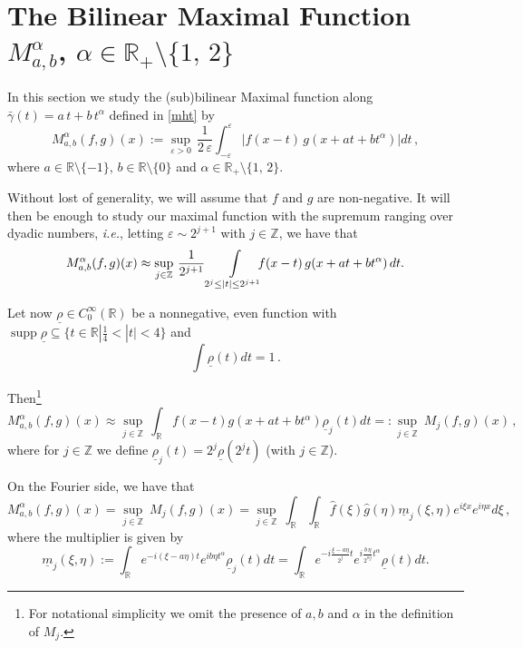 \documentclass[a4paper,reqno]{amsart}
\numberwithin{equation}{section}
\theoremstyle{definition}
\newcommand{\R}{\mathbb{R}}
\newcommand{\Z}{\mathbb{Z}}
\newcommand{\e}{\varepsilon}
\newcommand{\um}{\underline{m}}
\newcommand{\urho}{\underline{\rho}}
\def\a{\alpha}
\def\g{\gamma}
\DeclareMathOperator{\supp}{supp}
\begin{document}
\section{The Bilinear Maximal Function $M_{a,b}^\a$, $\a\in\R_+\setminus\{1,\,2\}$}\label{BiMax}
In this section we study the (sub)bilinear Maximal function along $\bar{\g}(t)=a\,t+b\,t^\a$ defined in \eqref{mht} by
\begin{equation*}
	M_{a,b}^\a(f,g)(x):= \sup_{\e>0}\,\frac{1}{2\,\e}\int_{-\e}^\e |f(x-t)\, g(x+at+bt^\a)|dt\,,
\end{equation*}
where $a\in\R\setminus\{-1\}$, $b\in\R\setminus\{0\}$ and $\a\in\R_+\setminus\{1,\,2\}$.

Without lost of generality, we will assume that
$f$ and $g$ are non-negative. It will then be enough to study our maximal function with the supremum ranging over dyadic numbers, \textit{i.e.}, letting  $\e\sim 2^{j+1}$ with $j\in\Z$, we have that
\begin{equation}
	M_{a,b}^\a(f,g)(x)\approx\sup\limits_{j\in\Z}\,\frac{1}{2^{j+1}}\int\limits_{2^j\le|t|\le2^{j+1}}\hspace{-.2cm} f(x-t)\,g(x+at+bt^\a)\,dt.
\end{equation}

Let now $\urho\in C^\infty_0(\R)$ be a nonnegative, even function with $\supp \urho \subseteq\{t\in\R|\frac{1}{4}<|t|<4\}$ and
\begin{equation*}
	\int\urho(t)dt=1\,.
\end{equation*}

Then\footnote{For notational simplicity we omit the presence of $a, b$ and $\a$ in the definition of $M_j$.}
\begin{equation*}
	M_{a,b}^\a(f,g)(x)\approx\sup\limits_{j\in\Z}\,\int_\R f(x-t)g(x+at+bt^\a)\urho_j(t)dt =: \sup\limits_{j\in\Z}\:M_j(f,g)(x) \,,
\end{equation*}
where for $j\in\Z$ we define  $\urho_j(t)=2^j\urho(2^j t)$ (with $j\in\Z$).

On the Fourier side, we have that
\begin{equation*}\label{Mabalpha}
	M_{a,b}^\a(f,g)(x)=\sup\limits_{j\in\Z}\:M_j(f,g)(x)=\sup\limits_{j\in\Z}\: \int_\R\int_\R \hat{f}(\xi)\hat{g}(\eta)\um_j(\xi,\eta)e^{i\xi x}e^{i\eta x}d\xi\,,
\end{equation*}
where the multiplier is given by
\begin{equation}
	\um_j(\xi,\eta):=\int_\R e^{-i(\xi-a\eta) t}e^{i b\eta t^\a} \urho_j(t)dt=\int_\R e^{-i\frac{\xi-a\eta}{2^j} t}e^{i\frac{b\,\eta}{2^{\a j}}t^\a} \urho(t)dt.
\end{equation}
\end{document}
